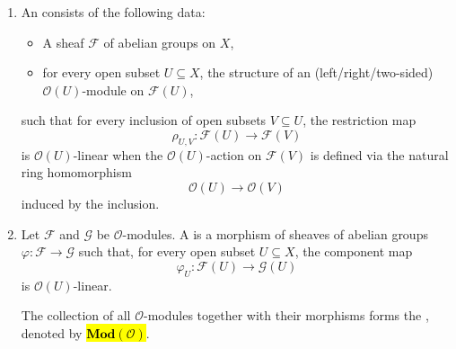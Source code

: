 \begin{definition}
\begin{enumerate}
        \begin{enumerate}
            \item An  consists of the following data:
            \begin{itemize}
                \item A sheaf $\mathcal{F}$ of abelian groups on $X$,
                \item for every open subset $U \subseteq X$, the structure of an (left/right/two-sided) $\mathcal{O}(U)$-module on $\mathcal{F}(U)$,
            \end{itemize}
            such that for every inclusion of open subsets $V \subseteq U$, the restriction map
            $$\rho_{U,V}: \mathcal{F}(U) \to \mathcal{F}(V)$$
            is $\mathcal{O}(U)$-linear when the $\mathcal{O}(U)$-action on $\mathcal{F}(V)$ is defined via the natural ring homomorphism
            $$\mathcal{O}(U) \to \mathcal{O}(V)$$
            induced by the inclusion.

            \item Let $\mathcal{F}$ and $\mathcal{G}$ be $\mathcal{O}$-modules. A  is a morphism of sheaves of abelian groups $\varphi: \mathcal{F} \to \mathcal{G}$ such that, for every open subset $U \subseteq X$, the component map
            $$\varphi_U : \mathcal{F}(U) \to \mathcal{G}(U)$$
            is $\mathcal{O}(U)$-linear.

            The collection of all $\mathcal{O}$-modules together with their morphisms forms the , denoted by \hl{$\mathbf{Mod}(\mathcal{O})$}.
        \end{enumerate}
    \end{enumerate}

\end{definition}